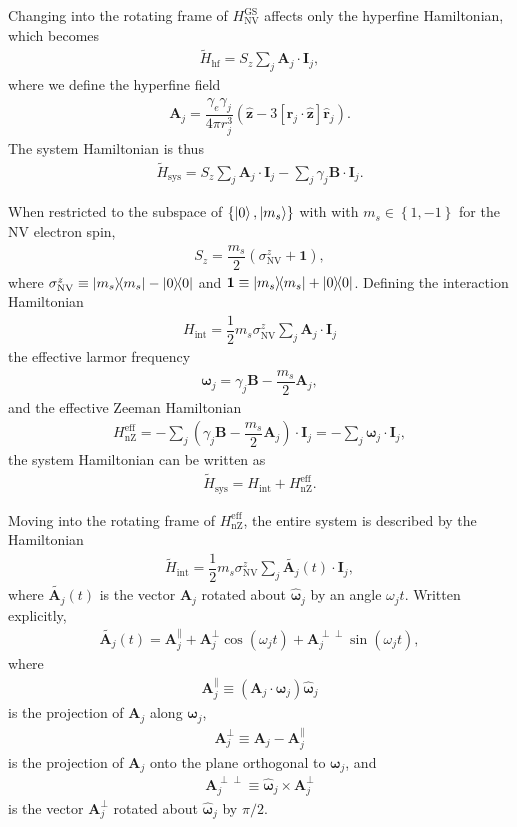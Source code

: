 \documentclass[twocolumn]{revtex4-1}
\renewcommand{\t}{\text} %
\newcommand{\f}[2]{\dfrac{#1}{#2}} %
\newcommand{\p}[1]{\left(#1\right)} %
\renewcommand{\sp}[1]{\left[#1\right]} %
\renewcommand{\set}[1]{\left\{#1\right\}} %
\renewcommand{\v}{\bm} %
\newcommand{\uv}[1]{\hat{\v{#1}}} %
\renewcommand{\c}{\cdot} %
\newcommand{\NV}{\t{NV}}
\begin{document}
Changing into the rotating frame of $H_\NV^\t{GS}$ affects only the
hyperfine Hamiltonian, which becomes
\begin{align}
  \tilde H_\t{hf} = S_z\sum_j \v A_j\c\v I_j,
\end{align}
where we define the hyperfine field
\begin{align}
  \v A_j = \f{\gamma_e\gamma_j}{4\pi r_j^3}\p{\uv z - 3\sp{\uv
  r_j\c\uv z}\uv r_j}.
\end{align}
The system Hamiltonian is thus
\begin{align}
  \tilde H_\t{sys} = S_z\sum_j \v A_j\c\v I_j
  -\sum_j\gamma_j\v B\c\v I_j.
\end{align}

When restricted to the subspace of $\set{\ket0,\ket{m_s}}$ with with
$m_s\in\set{1,-1}$ for the NV electron spin,
\begin{align}
  S_z = \f{m_s}2\p{\sigma_\NV^z+\mathbf1},
\end{align}
where $\sigma_\NV^z\equiv\op{m_s}-\op{0}$ and
$\mathbf1\equiv\op{m_s}+\op{0}$. Defining the interaction Hamiltonian
\begin{align}
  H_\t{int} = \f12m_s\sigma_\NV^z\sum_j\v A_j\c\v I_j
\end{align}
the effective larmor frequency
\begin{align}
  \v\omega_j = \gamma_j\v B - \f{m_s}2\v A_j,
\end{align}
and the effective Zeeman Hamiltonian
\begin{align}
  H_\t{nZ}^\t{eff} = -\sum_j\p{\gamma_j\v B - \f{m_s}2\v A_j}\c\v I_j
  = -\sum_j\v\omega_j\c\v I_j,
\end{align}
the system Hamiltonian can be written as
\begin{align}
  \tilde H_\t{sys} = H_\t{int} + H_\t{nZ}^\t{eff}.
  \label{S_H_sys_int_nZ}
\end{align}

Moving into the rotating frame of $H_\t{nZ}^\t{eff}$, the entire
system is described by the Hamiltonian
\begin{align}
  \tilde H_\t{int} = \f12m_s\sigma_\NV^z
  \sum_j\tilde{\v A_j}\p{t}\c\v I_j,
  \label{S_H_int_no_DD}
\end{align}
where $\tilde{\v A_j}\p{t}$ is the vector $\v A_j$ rotated about
$\uv\omega_j$ by an angle $\omega_jt$. Written explicitly,
\begin{align}
  \tilde{\v A_j}\p{t} = \v A_j^\parallel + \v A_j^\perp\cos\p{\omega_jt}
  + \v A_j^{\perp\perp}\sin\p{\omega_jt},
  \label{S_A_rot}
\end{align}
where
\begin{align}
  \v A_j^\parallel\equiv\p{\v A_j\c\uv\omega_j}\uv\omega_j
\end{align}
is the projection of $\v A_j$ along $\v \omega_j$,
\begin{align}
  \v A_j^\perp\equiv\v A_j-\v A_j^\parallel
\end{align}
is the projection of $\v A_j$ onto the plane orthogonal to
$\v\omega_j$, and
\begin{align}
  \v A_j^{\perp\perp}\equiv\uv\omega_j\times\v A_j^\perp
\end{align}
is the vector $\v A_j^\perp$ rotated about $\uv\omega_j$ by $\pi/2$.
\end{document}
